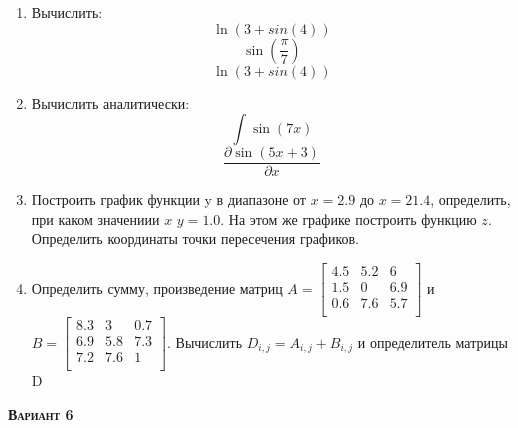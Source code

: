 \begin{enumerate}
\item Вычислить: 
\begin{equation*}\ln(3+sin(4))                     \end{equation*}
\begin{equation*}\sin \left( \dfrac{\pi}{7} \right)\end{equation*}
\begin{equation*}\ln(3+sin(4))                     \end{equation*}

\item Вычислить аналитически: 
 \begin{equation*} \int \sin(7x)           \end{equation*}\begin{equation*} {\dfrac{\partial \sin(5 x +3)}{\partial x}} \end{equation*}
\item Построить график функции y в диапазоне от $x=2.9$ до $x=21.4$, определить, при каком значениии $x$ $y=1.0$. На этом же графике построить функцию $z $. Определить координаты точки пересечения графиков. \item Определить сумму, произведение матриц $A=\begin{bmatrix}
4.5 &5.2 &6 \\
1.5 &0 &6.9 \\
0.6 &7.6 &5.7 \\
\end{bmatrix}
$ и $B=\begin{bmatrix}
8.3 &3 &0.7 \\
6.9 &5.8 &7.3 \\
7.2 &7.6 &1 \\
\end{bmatrix}
$. Вычислить $D_{i,j}=A_{i,j} + B_{i,j}$ и определитель матрицы D
\end{enumerate}
\textsc{\textbf{Вариант 6}}

